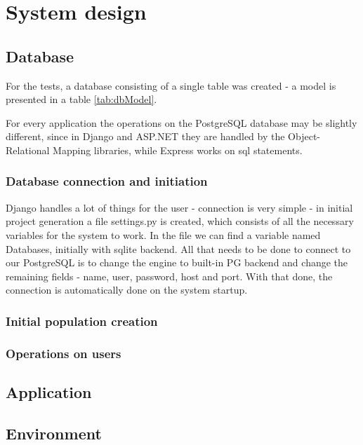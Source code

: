
\chapter{System design}

\section{Database}

For the tests, a database consisting of a single table was created - a model is presented in a table \ref{tab:dbModel}.



For every application the operations on the PostgreSQL database may be slightly different, since in Django and ASP.NET they are handled by the Object-Relational Mapping libraries, while Express works on sql statements.


\subsection{Database connection and initiation}

Django handles a lot of things for the user - connection is very simple - in initial project generation a file settings.py is created, which consists of all the necessary variables for the system to work. In the file we can find a variable named Databases, initially with sqlite backend. All that needs to be done to connect to our PostgreSQL is to change the engine to built-in PG backend and change the remaining fields - name, user, password, host and port. With that done, the connection is automatically done on the system startup.

\subsection{Initial population creation}
\subsection{Operations on users}

\section{Application}
\section{Environment}
